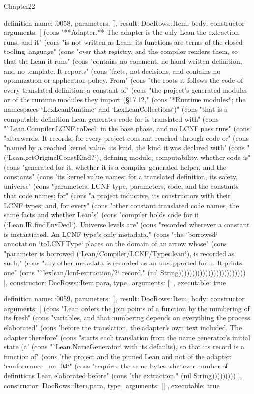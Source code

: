 \begin{lexlean}{Chapter22}
\begin{semanticmodule}
definition{
  name: i0058,
  parameters: [],
  result: DocRows::Item,
  body: constructor{
    arguments: [
      (cons "**Adapter.** The adapter is the only Lean the extraction runs, and it" (cons "is not written as Lean: its functions are terms of the closed tooling language" (cons "over that registry, and the compiler renders them, so that the Lean it runs" (cons "contains no comment, no hand-written definition, and no template. It reports" (cons "facts, not decisions, and contains no optimization or application policy. From" (cons "the roots it follows the code of every translated definition: a constant of" (cons "the project's generated modules or of the runtime modules they import (§17.12," (cons "*Runtime modules*; the namespaces `LexLeanRuntime` and `LexLeanCollections`)" (cons "that is a computable definition Lean generates code for is translated with" (cons "`Lean.Compiler.LCNF.toDecl` in the base phase, and no LCNF pass runs" (cons "afterwards. It records, for every project constant reached through code or" (cons "named by a reached kernel value, its kind, the kind it was declared with" (cons "(`Lean.getOriginalConstKind?`), defining module, computability, whether code is" (cons "generated for it, whether it is a compiler-generated helper, and the constants" (cons "its kernel value names; for a translated definition, its safety, universe" (cons "parameters, LCNF type, parameters, code, and the constants that code names; for" (cons "a project inductive, its constructors with their LCNF types; and, for every" (cons "other constant translated code names, the same facts and whether Lean's" (cons "compiler holds code for it (`Lean.IR.findEnvDecl`). Universe levels are" (cons "recorded wherever a constant is instantiated. An LCNF type's only metadata," (cons "the `borrowed` annotation `toLCNFType` places on the domain of an arrow whose" (cons "parameter is borrowed (`Lean/Compiler/LCNF/Types.lean`), is recorded as such;" (cons "any other metadata is recorded as an unsupported form. It prints one" (cons "`lexlean/lcnf-extraction/2` record." (nil String)))))))))))))))))))))))))
    ],
    constructor: DocRows::Item.para,
    type_arguments: []
  },
  executable: true
}

definition{
  name: i0059,
  parameters: [],
  result: DocRows::Item,
  body: constructor{
    arguments: [
      (cons "Lean orders the join points of a function by the numbering of its fresh" (cons "variables, and that numbering depends on everything the process elaborated" (cons "before the translation, the adapter's own text included. The adapter therefore" (cons "starts each translation from the name generator's initial state (a" (cons "`Lean.NameGenerator` with its defaults), so that its record is a function of" (cons "the project and the pinned Lean and not of the adapter: `conformance_ne_04`" (cons "requires the same bytes whatever number of definitions Lean elaborated before" (cons "the extraction." (nil String)))))))))
    ],
    constructor: DocRows::Item.para,
    type_arguments: []
  },
  executable: true
}


\end{semanticmodule}
\end{lexlean}

